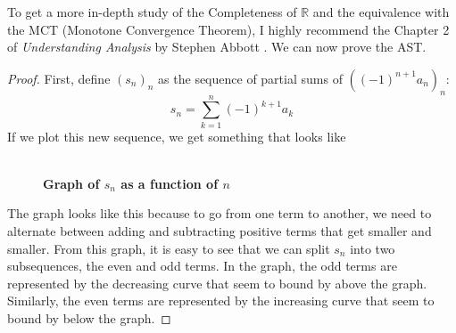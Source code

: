 \documentclass[10pt]{article}
\newcommand{\R}{\mathbb{R}}
\theoremstyle{definition}
\begin{document}
To get a more in-depth study of the Completeness of $\R$ and the equivalence with the MCT (Monotone Convergence Theorem), I highly recommend the Chapter 2 of \textit{Understanding Analysis} by Stephen Abbott \cite{understanding_analysis}. We can now prove the AST.

\begin{proof}
    First, define $(s_n)_n$ as the sequence of partial sums of $((-1)^{n+1}a_n)_n$:
    $$s_n = \sum_{k=1}^{n}(-1)^{k+1}a_k$$
    If we plot this new sequence, we get something that looks like
    \begin{figure}[h]
        \centering
        \\ \textbf{Graph of $s_n$ as a function of $n$}
    \end{figure}

    The graph looks like this because to go from one term to another, we need to alternate between adding and subtracting positive terms that get smaller and smaller. From this graph, it is easy to see that we can split $s_n$ into two subsequences, the even and odd terms. In the graph, the odd terms are represented by the decreasing curve that seem to bound by above the graph. Similarly, the even terms are represented by the increasing curve that seem to bound by below the graph. 


\end{proof}
\end{document}
